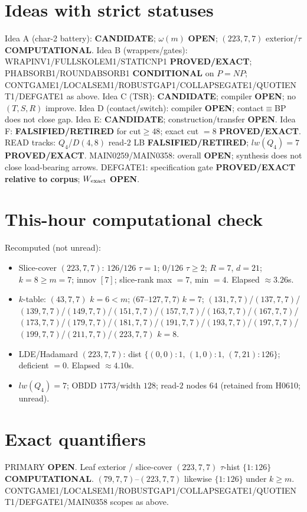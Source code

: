 \documentclass[11pt]{article}
\begin{document}
\section*{Ideas with strict statuses}
Idea A (char-2 battery): \textbf{CANDIDATE}; $\omega(m)$ \textbf{OPEN}; $(223,7,7)$ exterior/$\tau$ \textbf{COMPUTATIONAL}.
Idea B (wrappers/gates): WRAPINV1/FULLSKOLEM1/STATICNP1 \textbf{PROVED/EXACT};
PHABSORB1/ROUNDABSORB1 \textbf{CONDITIONAL} on $P=NP$;
CONTGAME1/LOCALSEM1/ROBUSTGAP1/COLLAPSEGATE1/QUOTIENT1/DEFGATE1 as above.
Idea C (TSR): \textbf{CANDIDATE}; compiler \textbf{OPEN}; no $(T,S,R)$ improve.
Idea D (contact/switch): compiler \textbf{OPEN}; contact$\equiv$BP does not close gap.
Idea E: \textbf{CANDIDATE}; construction/transfer \textbf{OPEN}.
Idea F: \textbf{FALSIFIED/RETIRED} for cut$\ge48$; exact cut $=8$ \textbf{PROVED/EXACT}.
READ tracks: $Q_4$/$D(4,8)$ read-$2$ LB \textbf{FALSIFIED/RETIRED}; $lw(Q_4)=7$ \textbf{PROVED/EXACT}.
MAIN0259/MAIN0358: overall \textbf{OPEN}; synthesis does not close load-bearing arrows.
DEFGATE1: specification gate \textbf{PROVED/EXACT relative to corpus}; $W_{\rm exact}$ \textbf{OPEN}.

\section*{This-hour computational check}
Recomputed (not unread):
\begin{itemize}
\item Slice-cover $(223,7,7)$: $126/126$ $\tau{=}1$; $0/126$ $\tau{\ge}2$; $R{=}7$, $d{=}21$;
  $k{=}8{\ge}m{=}7$; innov $[7]$; slice-rank max $=7$, min $=4$. Elapsed $\approx3.26$s.
\item $k$-table: $(43,7,7)$ $k{=}6{<}m$; $(67$--$127,7,7)$ $k{=}7$;
  $(131,7,7)$/$(137,7,7)$/$(139,7,7)$/$(149,7,7)$/$(151,7,7)$/$(157,7,7)$/$(163,7,7)$/$(167,7,7)$/$(173,7,7)$/$(179,7,7)$/$(181,7,7)$/$(191,7,7)$/$(193,7,7)$/$(197,7,7)$/$(199,7,7)$/$(211,7,7)$/$(223,7,7)$ $k{=}8$.
\item LDE/Hadamard $(223,7,7)$: dist $\{(0,0){:}1,\,(1,0){:}1,\,(7,21){:}126\}$; deficient $=0$. Elapsed $\approx4.10$s.
\item $lw(Q_4)=7$; OBDD $1773$/width $128$; read-$2$ nodes $64$ (retained from H0610; unread).
\end{itemize}

\section*{Exact quantifiers}
PRIMARY \textbf{OPEN}. Leaf exterior / slice-cover $(223,7,7)$ $\tau$-hist $\{1{:}126\}$ \textbf{COMPUTATIONAL}.
$(79,7,7)$--$(223,7,7)$ likewise $\{1{:}126\}$ under $k{\ge}m$. CONTGAME1/LOCALSEM1/ROBUSTGAP1/COLLAPSEGATE1/QUOTIENT1/DEFGATE1/MAIN0358 scopes as above.
\end{document}
